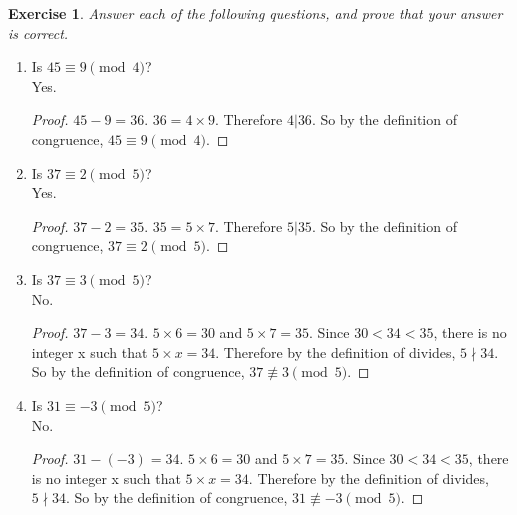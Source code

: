 \documentclass[12pt,leqno]{article}
\numberwithin{equation}{section}
\newtheorem{exer}[thm]{Exercise}
\theoremstyle{definition}
\begin{document}
\pagebreak
\begin{exer} Answer each of the following questions, and prove that your answer is
correct. \end{exer}
\begin{enumerate}
\item[(1)] Is $45 \equiv 9\pmod{4}$?
\\Yes.
\begin{proof}[Proof]
$45-9 = 36.$  $36 = 4 \times 9.$  Therefore $4|36$.  So by the definition of congruence, $45 \equiv 9\pmod{4}.$
\end{proof}

\item[(2)] Is $37 \equiv 2 \pmod{5}$?
\\Yes.
\begin{proof}[Proof]
$37-2 = 35.$  $35 = 5 \times 7.$  Therefore $5|35$.  So by the definition of congruence, $37 \equiv 2\pmod{5}.$
\end{proof}

\item[(3)] Is ${37 \equiv 3 \pmod{5}}$?
\\No.
\begin{proof}[Proof]
$37-3 = 34.$  $5 \times 6 = 30$ and $5 \times 7 = 35$.  Since $30 < 34 < 35$, there is no integer x such that $5 \times x = 34$. Therefore by the definition of divides, $5 \nmid 34$.  So by the definition of congruence, $37 \not \equiv 3\pmod{5}.$
\end{proof}

\item[(4)] Is $31 \equiv -3 \pmod{5}$?
\\No.
\begin{proof}[Proof]
$31-(-3) = 34.$  $5 \times 6 = 30$ and $5 \times 7 = 35$.  Since $30 < 34 < 35$, there is no integer x such that $5 \times x = 34$. Therefore by the definition of divides, $5 \nmid 34$.  So by the definition of congruence, $31 \not \equiv -3\pmod{5}.$
\end{proof}

\end{enumerate}
\end{document}
